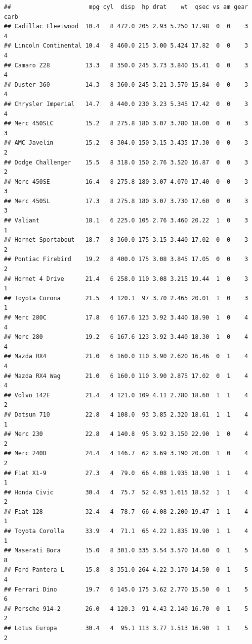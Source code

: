 \documentclass[
]{article}
\begin{document}
\begin{verbatim}
##                      mpg cyl  disp  hp drat    wt  qsec vs am gear carb
## Cadillac Fleetwood  10.4   8 472.0 205 2.93 5.250 17.98  0  0    3    4
## Lincoln Continental 10.4   8 460.0 215 3.00 5.424 17.82  0  0    3    4
## Camaro Z28          13.3   8 350.0 245 3.73 3.840 15.41  0  0    3    4
## Duster 360          14.3   8 360.0 245 3.21 3.570 15.84  0  0    3    4
## Chrysler Imperial   14.7   8 440.0 230 3.23 5.345 17.42  0  0    3    4
## Merc 450SLC         15.2   8 275.8 180 3.07 3.780 18.00  0  0    3    3
## AMC Javelin         15.2   8 304.0 150 3.15 3.435 17.30  0  0    3    2
## Dodge Challenger    15.5   8 318.0 150 2.76 3.520 16.87  0  0    3    2
## Merc 450SE          16.4   8 275.8 180 3.07 4.070 17.40  0  0    3    3
## Merc 450SL          17.3   8 275.8 180 3.07 3.730 17.60  0  0    3    3
## Valiant             18.1   6 225.0 105 2.76 3.460 20.22  1  0    3    1
## Hornet Sportabout   18.7   8 360.0 175 3.15 3.440 17.02  0  0    3    2
## Pontiac Firebird    19.2   8 400.0 175 3.08 3.845 17.05  0  0    3    2
## Hornet 4 Drive      21.4   6 258.0 110 3.08 3.215 19.44  1  0    3    1
## Toyota Corona       21.5   4 120.1  97 3.70 2.465 20.01  1  0    3    1
## Merc 280C           17.8   6 167.6 123 3.92 3.440 18.90  1  0    4    4
## Merc 280            19.2   6 167.6 123 3.92 3.440 18.30  1  0    4    4
## Mazda RX4           21.0   6 160.0 110 3.90 2.620 16.46  0  1    4    4
## Mazda RX4 Wag       21.0   6 160.0 110 3.90 2.875 17.02  0  1    4    4
## Volvo 142E          21.4   4 121.0 109 4.11 2.780 18.60  1  1    4    2
## Datsun 710          22.8   4 108.0  93 3.85 2.320 18.61  1  1    4    1
## Merc 230            22.8   4 140.8  95 3.92 3.150 22.90  1  0    4    2
## Merc 240D           24.4   4 146.7  62 3.69 3.190 20.00  1  0    4    2
## Fiat X1-9           27.3   4  79.0  66 4.08 1.935 18.90  1  1    4    1
## Honda Civic         30.4   4  75.7  52 4.93 1.615 18.52  1  1    4    2
## Fiat 128            32.4   4  78.7  66 4.08 2.200 19.47  1  1    4    1
## Toyota Corolla      33.9   4  71.1  65 4.22 1.835 19.90  1  1    4    1
## Maserati Bora       15.0   8 301.0 335 3.54 3.570 14.60  0  1    5    8
## Ford Pantera L      15.8   8 351.0 264 4.22 3.170 14.50  0  1    5    4
## Ferrari Dino        19.7   6 145.0 175 3.62 2.770 15.50  0  1    5    6
## Porsche 914-2       26.0   4 120.3  91 4.43 2.140 16.70  0  1    5    2
## Lotus Europa        30.4   4  95.1 113 3.77 1.513 16.90  1  1    5    2
\end{verbatim}
\end{document}

